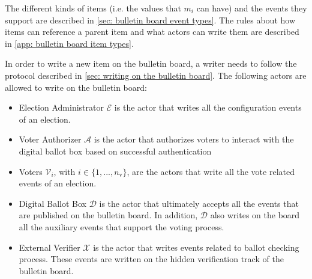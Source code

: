 \begin{algorithm}[ht]
    \DontPrintSemicolon
    \caption{$\mathsf{HistoryVer}(\boldsymbol{b}, h_0)$}
    \label{alg: history ver}

     
\end{algorithm}

The different kinds of items (i.e. the values that $m_i$ can have) and the events they support are described in \cref{sec: bulletin board event types}. The rules about how items can reference a parent item and what actors can write them are described in \cref{app: bulletin board item types}.

In order to write a new item on the bulletin board, a writer needs to follow the protocol described in \cref{sec: writing on the bulletin board}. The following actors are allowed to write on the bulletin board:
\begin{itemize}
    \item Election Administrator $\mathcal{E}$ is the actor that writes all the configuration events of an election.
    \item Voter Authorizer $\mathcal{A}$ is the actor that authorizes voters to interact with the digital ballot box based on successful authentication
    \item Voters $\mathcal{V}_i$, with $i \in \{1, ..., n_\mathrm{v}\}$, are the actors that write all the vote related events of an election.
    \item Digital Ballot Box $\mathcal{D}$ is the actor that ultimately accepts all the events that are published on the bulletin board. In addition, $\mathcal{D}$ also writes on the board all the auxiliary events that support the voting process.
    \item External Verifier $\mathcal{X}$ is the actor that writes events related to ballot checking process. These events are written on the hidden verification track of the bulletin board.
\end{itemize}


